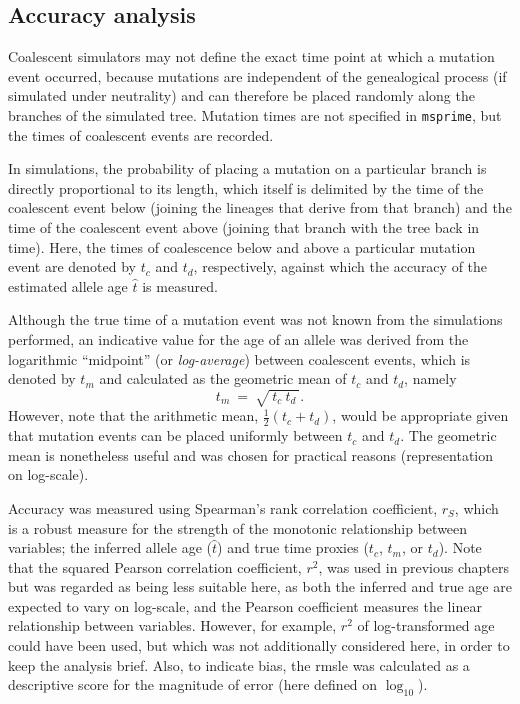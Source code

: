 %
\subsection{Accuracy analysis}
%

Coalescent simulators may not define the exact time point at which a mutation event occurred, because mutations are independent of the genealogical process (if simulated under neutrality) and can therefore be placed randomly along the branches of the simulated tree.
Mutation times are not specified in \texttt{msprime}, but the times of coalescent events are recorded.

In simulations, the probability of placing a mutation on a particular branch is directly proportional to its length, which itself is delimited by the time of the coalescent event below (joining the lineages that derive from that branch) and the time of the coalescent event above (joining that branch with the tree back in time).
Here, the times of coalescence below and above a particular mutation event are denoted by $t_c$ and $t_d$, respectively, against which the accuracy of the estimated allele age $\hat{t}$ is measured.

Although the true time of a mutation event was not known from the simulations performed, an indicative value for the age of an allele was derived from the logarithmic ``midpoint'' (or \emph{log-average}) between coalescent events, which is denoted by $t_m$ and calculated as the geometric mean of $t_c$ and $t_d$, namely
\begin{equation}
	t_m~=~\sqrt{~t_c ~ t_d~}\text{.}
\end{equation}
However, note that the arithmetic mean, ${\frac{1}{2}(t_c + t_d)}$, would be appropriate given that mutation events can be placed uniformly between $t_c$ and $t_d$.
The geometric mean is nonetheless useful and was chosen for practical reasons (\eg representation on log-scale).


Accuracy was measured using Spearman's rank correlation coefficient, $r_S$, which is a robust measure for the strength of the monotonic relationship between  variables; \ie the inferred allele age ($\hat{t}$) and true time proxies ($t_c$, $t_m$, or $t_d$).
Note that the squared Pearson correlation coefficient, $r^2$, was used in previous chapters but was regarded as being less suitable here, as both the inferred and true age are expected to vary on log-scale, and the Pearson coefficient measures the linear relationship between variables.
However, for example, $r^2$ of log-transformed age could have been used, but which was not additionally considered here, in order to keep the analysis brief.
Also, to indicate bias, the \gls{rmsle} was calculated as a descriptive score for the magnitude of error (here defined on $\log_{10}$).

